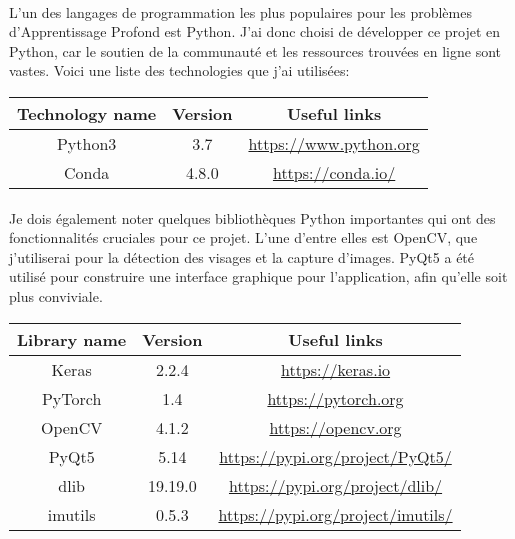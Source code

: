 \paragraph{}
L'un des langages de programmation les plus populaires pour les problèmes d'Apprentissage Profond est Python.
J'ai donc choisi de développer ce projet en Python, car le soutien de la communauté et les ressources trouvées en ligne sont vastes.
Voici une liste des technologies que j'ai utilisées:

\begin{center}
    \begin{tabular}{ c c c }
        Technology name & Version & Useful links \\
        \hline
        Python3 & 3.7 & \url{https://www.python.org} \\
        Conda & 4.8.0 & \url{https://conda.io/} \\
    \end{tabular}
\end{center}

\paragraph{}
Je dois également noter quelques bibliothèques Python importantes qui ont des fonctionnalités cruciales pour ce projet.
L'une d'entre elles est OpenCV, que j'utiliserai pour la détection des visages et la capture d'images.
PyQt5 a été utilisé pour construire une interface graphique pour l'application, afin qu'elle soit plus conviviale.

\begin{center}
    \begin{tabular}{ c c c }
        Library name & Version & Useful links \\
        \hline
        Keras & 2.2.4 & \url{https://keras.io} \\
        PyTorch & 1.4 & \url{https://pytorch.org} \\
        OpenCV & 4.1.2 & \url{https://opencv.org} \\
        PyQt5 & 5.14 & \url{https://pypi.org/project/PyQt5/} \\
        dlib & 19.19.0 & \url{https://pypi.org/project/dlib/} \\
        imutils & 0.5.3 & \url{https://pypi.org/project/imutils/} \\
    \end{tabular}
\end{center}

